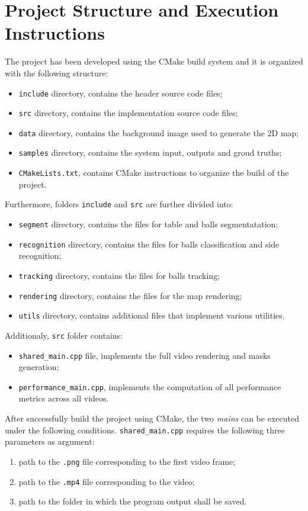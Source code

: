 \section{Project Structure and Execution Instructions}


The project has been developed using the CMake build system and it is organized with the
following structure:
\begin{itemize}
    \item \verb|include| directory, contains the header source code files;
    \item \verb|src| directory, contains the implementation source code files;
    \item \verb|data| directory, contains the background image used to generate the 2D map;
    \item \verb|samples| directory, contains the system input, outputs and groud truths;
    \item \verb|CMakeLists.txt|, contains CMake instructions to organize the build of the project. 
\end{itemize}

\noindent
Furthermore, folders \verb|include| and \verb|src| are further divided into:
\begin{itemize}
    \item \verb|segment| directory, contains the files for table and balls segmentatation;
    \item \verb|recognition| directory, contains the files for balls classification and side recognition;
    \item \verb|tracking| directory, contains the files for balls tracking;
    \item \verb|rendering| directory, contains the files for the map rendering;
    \item \verb|utils| directory, contains additional files that implement various utilities.
\end{itemize}

\noindent
Additionaly, \verb|src| folder contains:
\begin{itemize}
    \item \verb|shared_main.cpp| file, implements the full video rendering and masks generation;
    \item \verb|performance_main.cpp|, implements the computation of all performance metrics across all videos.
\end{itemize}

\noindent
After successfully build the project using CMake, the two \textit{mains} can be executed under the following conditions.
\verb|shared_main.cpp| requires the following three parameters as argument:
\begin{enumerate}
    \item path to the \verb|.png| file corresponding to the first video frame;
    \item path to the \verb|.mp4| file corresponding to the video;
    \item path to the folder in which the program output shall be saved.
\end{enumerate}

